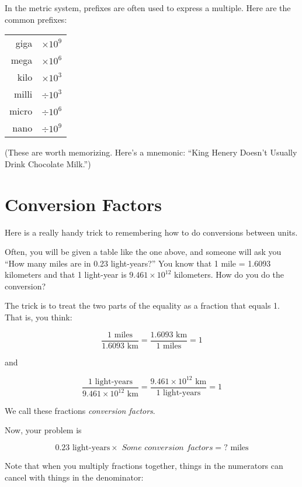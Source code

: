 In the metric system, prefixes are often used to express a multiple. Here are the common prefixes:

\begin{mdframed}[style=important, frametitle={Common Prefixes for Metric Units}]

\begin{tabular}{r | l}
giga  & $\times 10^{9}$\\
mega  & $\times 10^{6}$\\
kilo  & $\times 10^{3}$\\
milli  & $\div 10^{3}$\\
micro  & $\div 10^{6}$\\
nano  & $\div 10^{9}$\\
\end{tabular}

(These are worth memorizing. Here's a mnemonic: ``King Henery Doesn't Usually Drink Chocolate Milk.'')
\end{mdframed}

\section{Conversion Factors}

Here is a really handy trick to remembering how to do conversions
between units.

Often, you will be given a table like the one above, and someone will ask you
``How many miles are in 0.23 light-years?''  You know that 1 mile = 1.6093
kilometers and that 1 light-year is $9.461 \times 10^{12}$ kilometers.
How do you do the conversion?

The trick is to treat the two parts of the equality as a fraction that equals 1.  That is, you think:

$$\frac{1 \text{ miles}}{1.6093 \text{ km}} = \frac{1.6093 \text{ km}}{1 \text{ miles}} = 1$$

and

$$\frac{1 \text{ light-years}}{9.461 \times 10^{12} \text{ km}} = \frac{9.461 \times 10^{12} \text{ km}}{1 \text{ light-years}} = 1$$

We call these fractions \textit{conversion factors}.

Now, your problem is

$$0.23 \text{ light-years} \times \textit{ Some conversion factors} = ? \text{ miles}$$

Note that when you multiply fractions together, things in the numerators can cancel with things in the denominator:

